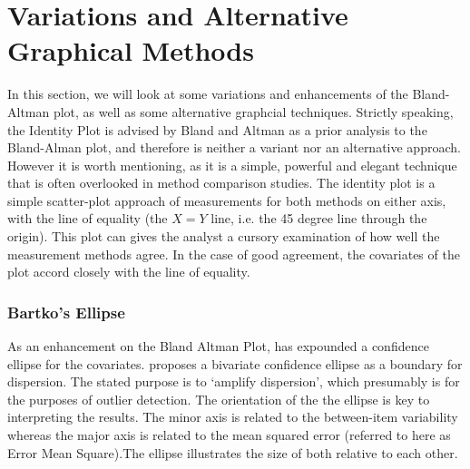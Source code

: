 \documentclass[Main.tex]{subfiles}
\begin{document}
\section{Variations and Alternative Graphical Methods}
In this section, we will look at some variations and enhancements of the Bland-Altman plot, as well as some alternative graphcial techniques. Strictly speaking, the Identity Plot is advised by Bland and Altman as a prior analysis to the Bland-Alman plot, and therefore is neither a variant nor an alternative approach. However it is worth mentioning, as it is a simple, powerful and elegant technique that is often overlooked in method comparison studies. The identity plot is a simple scatter-plot approach of measurements for both methods on either axis, with the line of equality (the $X=Y$ line, i.e. the 45 degree line through the origin). This plot can gives the analyst a cursory examination of how well the measurement methods agree. In the case of good agreement, the covariates of the plot accord closely with the line of equality.
	

	
	
	\subsubsection{Bartko's Ellipse}
	
	As an enhancement on the Bland Altman Plot, \citet{Bartko} has
	expounded a confidence ellipse for the covariates. \citet{Bartko} proposes
	a bivariate confidence ellipse as a boundary for dispersion. The stated purpose is to `amplify dispersion', which presumably is for  the purposes of outlier detection. The orientation of the the ellipse is key to interpreting the results. The minor axis is related to the between-item variability whereas the major axis is related to the mean squared error (referred to here as Error Mean Square).The ellipse illustrates the size of both relative to each
	other. 
	
\end{document}
